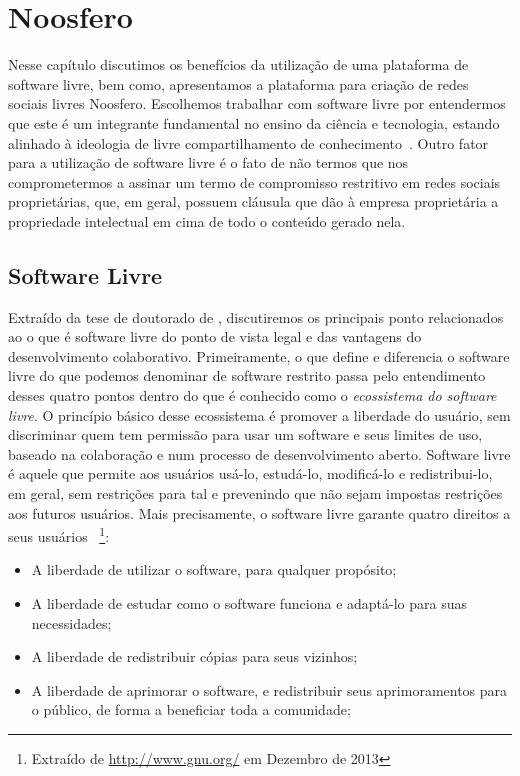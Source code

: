 \chapter{Noosfero}
\label{cap:noosfero}

Nesse capítulo discutimos os benefícios da utilização de uma
plataforma de software livre, bem como, apresentamos a plataforma para criação de
redes sociais livres Noosfero.
%
Escolhemos trabalhar com software livre por
entendermos que este é um integrante fundamental no ensino da ciência e 
tecnologia, estando alinhado à ideologia de livre compartilhamento de
conhecimento~\cite{kon2011}.
%
Outro fator para a utilização de software livre é o
fato de não termos que nos comprometermos a assinar um termo de compromisso
restritivo em redes sociais proprietárias, que, em geral, possuem cláusula que dão à
empresa proprietária a propriedade intelectual em cima de todo o conteúdo
gerado nela.


\section{Software Livre}

Extraído da tese de doutorado de , discutiremos os
principais ponto relacionados ao o que é software livre do ponto de vista legal e
das vantagens do desenvolvimento colaborativo.
%
Primeiramente, o que define e diferencia
o software livre do que podemos denominar de software restrito passa pelo
entendimento desses quatro pontos dentro do que é
conhecido como o \textit{ecossistema do software livre}.
%
O princípio básico desse ecossistema é promover a liberdade do usuário,
sem discriminar quem tem permissão para usar um software e seus limites de uso,
baseado na colaboração e num processo de desenvolvimento aberto.
%
Software livre é aquele que permite aos usuários usá-lo, estudá-lo, modificá-lo e
redistribui-lo, em geral, sem restrições para tal e prevenindo que não sejam
impostas restrições aos futuros usuários. 
%
Mais precisamente, o software livre garante quatro direitos a seus usuários
~\footnote{Extraído de \url{http://www.gnu.org/} em Dezembro de 2013}:

\begin{itemize}
  \item A liberdade de utilizar o software, para qualquer propósito;
  \item A liberdade de estudar como o software funciona e adaptá-lo para suas necessidades;
  \item A liberdade de redistribuir cópias para seus vizinhos;
  \item A liberdade de aprimorar o software, e redistribuir seus aprimoramentos para o público,
  de forma a beneficiar toda a comunidade;
\end{itemize}


